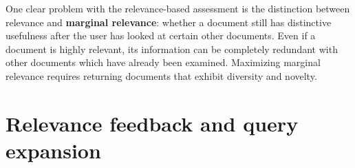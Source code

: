 \documentclass[letterpaper,11pt]{article}
\begin{document}
One clear problem with the relevance-based assessment is the distinction between relevance and \textbf{marginal relevance}: whether a document still has distinctive usefulness after the user has looked at certain other documents. Even if a document is highly relevant, its information can be completely redundant with other documents which have already been examined. Maximizing marginal relevance requires returning documents that exhibit diversity and novelty.

\section{Relevance feedback and query expansion}










\end{document}
